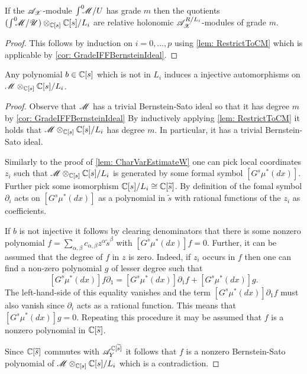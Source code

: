 \begin{lemma}\label{lem: QuotientsRelativeHolonomic}
  If the $\mathscr{A}_{\mathscr{X}}$-module $\int^0 \mkern -8mu\mathscr{M}/U$ has grade $m$ then the quotients $(\int^0 \mkern -8mu\mathscr{M}/\mathscr{U})\otimes_{\mathbb{C}[s]} \mathbb{C}[s]/L_{i}$ are relative holonomic $\mathscr{A}_{\mathscr{X}}^{R/L_i}$-modules of grade $m$.
\end{lemma}
\begin{proof}
  This follows by induction on $i=0,\ldots,p$ using \cref{lem: RestrictToCM} which is applicable by \cref{cor: GradeIFFBernsteinIdeal}.
\end{proof}
\begin{lemma}\label{lem: InjectiveEll}
  Any polynomial $b\in \mathbb{C}[s]$ which is not in $L_i$ induces a injective automorphisms on $\mathscr{M} \otimes_{\mathbb{C}[s]}\mathbb{C}[s]/L_i$.
\end{lemma}
\begin{proof}
  Observe that $\mathscr{M}$ has a trivial Bernstein-Sato ideal so that it has degree $m$ by \cref{cor: GradeIFFBernsteinIdeal}
  By inductively applying \cref{lem: RestrictToCM} it holds that $\mathscr{M} \otimes_{\mathbb{C}[s]}\mathbb{C}[s]/L_i$ has degree $m$.
  In particular, it has a trivial Bernstein-Sato ideal.

  Similarly to the proof of \cref{lem: CharVarEstimateW} one can pick local coordinates $z_i$ such that $\mathscr{M} \otimes_{\mathbb{C}[s]}\mathbb{C}[s]/L_i$ is generated by some formal symbol $[G^s \mu^*(dx)]$.
  Further pick some isomorphism $\mathbb{C}[s]/L_i \cong \mathbb{C}[\widetilde{s}]$.
  By definition of the fomal symbol $\partial_i$ acts on $[G^s \mu^*(dx)]$ as a polynomial in $\widetilde{s}$ with rational functions of the $z_i$ as coefficients.

  If $b$ is not injective it follows by clearing denominators that there is some nonzero polynomial $f = \sum_{\alpha,\beta} c_{\alpha,\beta} z^\alpha \widetilde{s}^\beta$ with $[G^s \mu^*(dx)] f = 0$.
  Further, it can be assumed that the degree of $f$ in $z$ is zero.
  Indeed, if $z_i$ occurs in $f$ then one can find a non-zero polynomial $g$ of lesser degree such that
  $$[G^s \mu^*(dx)] f\partial_1 = [G^s \mu^*(dx)]\partial_1 f + [G^s \mu^*(dx)] g.$$
  The left-hand-side of this equality vanishes and the term $[G^s \mu^*(dx)]\partial_1 f$ must also vanish since $\partial_i$ acts as a rational function.
  This means that $[G^s \mu^*(dx)] g = 0$.
  Repeating this procedure it may be assumed that $f$ is a nonzero polynomial in $\mathbb{C}[\widetilde{s}]$.

  Since $\mathbb{C}[\widetilde{s}]$ commutes with $\mathscr{A}_Y^{\mathbb{C}[\widetilde{s}]}$ it follows that $f$ is a nonzero Bernstein-Sato polynomial of $\mathscr{M} \otimes_{\mathbb{C}[s]}\mathbb{C}[s]/L_i$ which is a contradiction.
\end{proof}
